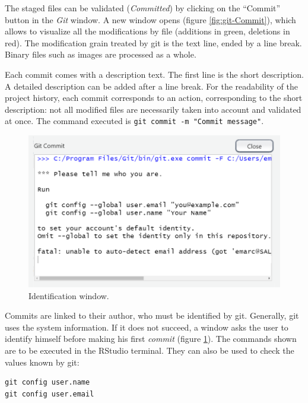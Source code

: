 \documentclass[
  12pt,
  american,
  a4paper,
  extrafontsizes,onecolumn,openright
  ]{memoir}
\begin{document}
\normalsize

The staged files can be validated (\emph{Committed}) by clicking on the \enquote{Commit} button in the \emph{Git} window.
A new window opens (figure \ref{fig:git-Commit}), which allows to visualize all the modifications by file (additions in green, deletions in red).
The modification grain treated by git is the text line, ended by a line break.
Binary files such as images are processed as a whole.

Each commit comes with a description text.
The first line is the short description.
A detailed description can be added after a line break.
For the readability of the project history, each commit corresponds to an action, corresponding to the short description: not all modified files are necessarily taken into account and validated at once.
The command executed is \texttt{git\ commit\ -m\ "Commit\ message"}.



\scriptsize

\begin{figure}

{\centering \includegraphics[width=0.8\linewidth]{images/git-id} 

}

\caption{Identification window.}\label{fig:git-id}
\end{figure}

\normalsize

Commits are linked to their author, who must be identified by git.
Generally, git uses the system information.
If it does not succeed, a window asks the user to identify himself before making his first \emph{commit} (figure \ref{fig:git-id}).
The commands shown are to be executed in the RStudio terminal.
They can also be used to check the values known by git:

\begin{verbatim}
git config user.name
git config user.email
\end{verbatim}
\end{document}
